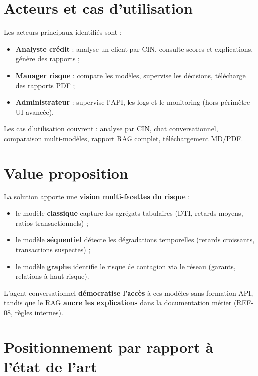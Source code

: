 
\section{Acteurs et cas d'utilisation}

Les acteurs principaux identifiés sont :
\begin{itemize}[leftmargin=*]
  \item \textbf{Analyste crédit} : analyse un client par CIN, consulte scores et explications, génère des rapports ;
  \item \textbf{Manager risque} : compare les modèles, supervise les décisions, télécharge des rapports PDF ;
  \item \textbf{Administrateur} : supervise l'API, les logs et le monitoring (hors périmètre UI avancée).
\end{itemize}

Les cas d'utilisation couvrent : analyse par CIN, chat conversationnel, comparaison multi-modèles, rapport RAG complet, téléchargement MD/PDF.

\section{Value proposition}

La solution apporte une \textbf{vision multi-facettes du risque} :
\begin{itemize}[leftmargin=*]
  \item le modèle \textbf{classique} capture les agrégats tabulaires (DTI, retards moyens, ratios transactionnels) ;
  \item le modèle \textbf{séquentiel} détecte les dégradations temporelles (retards croissants, transactions suspectes) ;
  \item le modèle \textbf{graphe} identifie le risque de contagion via le réseau (garants, relations à haut risque).
\end{itemize}

L'agent conversationnel \textbf{démocratise l'accès} à ces modèles sans formation API, tandis que le RAG \textbf{ancre les explications} dans la documentation métier (REF-08, règles internes).

\section{Positionnement par rapport à l'état de l'art}


